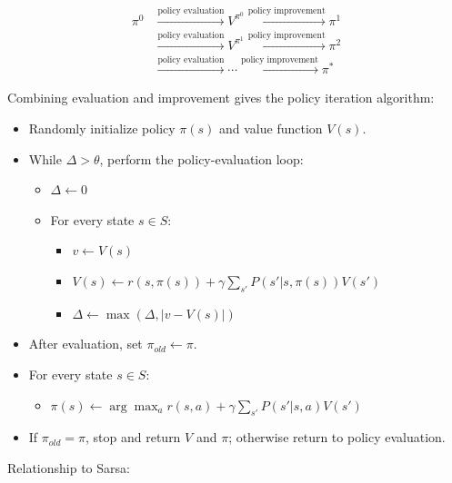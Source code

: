 \[
\begin{aligned}
\pi^{0} &\xrightarrow{\text{policy evaluation}} V^{\pi^{0}} \xrightarrow{\text{policy improvement}} \pi^{1} \\
&\xrightarrow{\text{policy evaluation}} V^{\pi^{1}} \xrightarrow{\text{policy improvement}} \pi^{2} \\
&\xrightarrow{\text{policy evaluation}} \cdots \xrightarrow{\text{policy improvement}} \pi^{*}
\end{aligned}
\]

Combining evaluation and improvement gives the policy iteration algorithm:

\begin{itemize}
\tightlist
\item
  Randomly initialize policy \(\pi(s)\) and value function \(V(s)\).
\item
{}
  While \(\Delta>\theta\), perform the policy-evaluation loop:

  \begin{itemize}
  \tightlist
  \item
    \(\Delta\leftarrow 0\)
  \item
{}
    For every state \(s\in S\):

    \begin{itemize}
    \tightlist
    \item
      \(v\leftarrow V(s)\)
    \item
      \(V(s)\leftarrow r(s,\pi(s))+\gamma\sum_{s'}P(s'|s,\pi(s))V(s')\)
    \item
      \(\Delta\leftarrow \max(\Delta,|v-V(s)|)\)
    \end{itemize}
  \end{itemize}
\item
  After evaluation, set \(\pi_{old}\leftarrow\pi\).
\item
{}
  For every state \(s\in S\):

  \begin{itemize}
  \tightlist
  \item
    \(\pi(s)\leftarrow \arg\max_a r(s,a)+\gamma\sum_{s'}P(s'|s,a)V(s')\)
  \end{itemize}
\item
  If \(\pi_{old}=\pi\), stop and return \(V\) and \(\pi\); otherwise return to policy evaluation.
\end{itemize}

Relationship to Sarsa:

